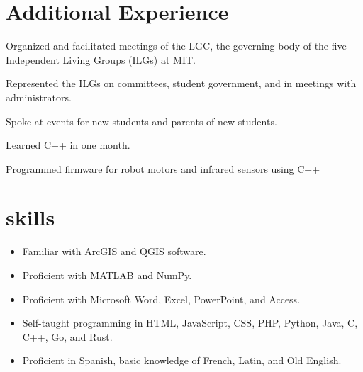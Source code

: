\documentclass[11pt]{article}
\begin{document}
\section{Additional Experience}
\def\employer{Living Group Council (LGC)}
\def\location{Cambridge, MA}
\def\title{Speaker; Undergraduate Association Representative}
\def\dates{May 2015--February 2018}
\begin{position}
\item Organized and facilitated meetings of the LGC, the governing body of the five Independent Living Groups (ILGs) at MIT.
\item Represented the ILGs on committees, student government, and in meetings with administrators.
\item Spoke at events for new students and parents of new students.
\end{position}

\def\employer{Mobile Autonomous Systems Laboratory}
\def\location{Cambridge, MA}
\def\title{Participant/Programmer}
\def\dates{January 2015}
\begin{position}
\item Learned C++ in one month.
\item Programmed firmware for robot motors and infrared sensors using C++
\end{position}

\section{skills}
\begin{itemize}
\item Familiar with ArcGIS and QGIS software.
\item Proficient with MATLAB and NumPy.
\item Proficient with Microsoft Word, Excel, PowerPoint, and Access.
\item Self-taught programming in HTML, JavaScript, CSS, PHP, Python, Java, C, C++, Go, and Rust.
\item Proficient in Spanish, basic knowledge of French, Latin, and Old English.
\end{itemize}
\end{document}
